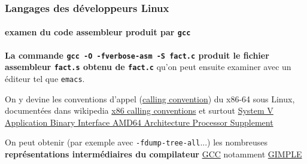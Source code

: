\documentclass[xcolor=svgnames,final,smaller,a4]{beamer}
\begin{document}
\begin{frame}
  \frametitle{Langages des développeurs Linux}
  \framesubtitle{examen du code assembleur produit par \texttt{gcc}}

  \textbf{La commande \texttt{gcc -O -fverbose-asm -S fact.c} produit
    le fichier assembleur \texttt{fact.s} obtenu de \texttt{fact.c}}
  qu'on peut ensuite examiner avec un éditeur tel que \texttt{emacs}.

  \vspace{0.5cm}
  
  On y devine les conventions d'appel
  (\href{https://en.wikipedia.org/wiki/Calling_convention}{calling
    convention}) du x86-64 sous Linux, documentées dans wikipedia
  \href{https://en.wikipedia.org/wiki/X86_calling_conventions}{x86
    calling conventions} et surtout
  \href{https://raw.githubusercontent.com/wiki/hjl-tools/x86-psABI/x86-64-psABI-1.0.pdf}{System
    V Application Binary Interface AMD64 Architecture Processor
    Supplement}

  \vspace{0.5cm}

  \begin{relsize}{-1}
    On peut obtenir (par exemple avec \texttt{-fdump-tree-all}...) les
    nombreuses \textbf{représentations intermédiaires du compilateur}
    \href{http://gcc.gnu.org/}{GCC} notamment
    \href{https://gcc.gnu.org/onlinedocs/gccint/GIMPLE.html}{GIMPLE}
  \end{relsize}
  
\end{frame}
\end{document}

